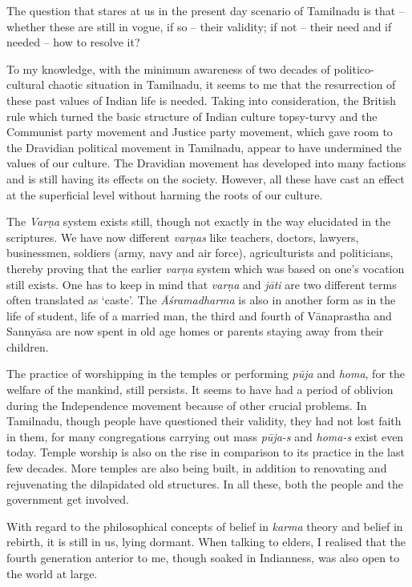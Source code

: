 The question that stares at us in the present day scenario of Tamilnadu is that – whether these are still in vogue, if so – their validity; if not – their need and if needed – how to resolve it?

To my knowledge, with the minimum awareness of two decades of politico-cultural chaotic situation in Tamilnadu, it seems to me that the resurrection of these past values of Indian life is needed. Taking into consideration, the British rule which turned the basic structure of Indian culture topsy-turvy and the Communist party movement and Justice party movement, which gave room to the Dravidian political movement in Tamilnadu, appear to have undermined the values of our culture. The Dravidian movement has developed into many factions and is still having its effects on the society. However, all these have cast an effect at the superficial level without harming the roots of our culture.

The \textit{Varṇa} system exists still, though not exactly in the way elucidated in the scriptures. We have now different \textit{varṇas} like teachers, doctors, lawyers, businessmen, soldiers (army, navy and air force), agriculturists and politicians, thereby proving that the earlier \textit{varṇa} system which was based on one’s vocation still exists. One has to keep in mind that \textit{varṇa} and \textit{jāti} are two different terms often translated as ‘caste’. The \textit{Āśramadharma} is also in another form as in the life of student, life of a married man, the third and fourth of Vānaprastha and Sannyāsa are now spent in old age homes or parents staying away from their children.

The practice of worshipping in the temples or performing \textit{pūja} and \textit{homa}, for the welfare of the mankind, still persists. It seems to have had a period of oblivion during the Independence movement because of other crucial problems. In Tamilnadu, though people have questioned their validity, they had not lost faith in them, for many congregations carrying out mass \textit{pūja-s} and \textit{homa-s} exist even today. Temple worship is also on the rise in comparison to its practice in the last few decades. More temples are also being built, in addition to renovating and rejuvenating the dilapidated old structures. In all these, both the people and the government get involved.

With regard to the philosophical concepts of belief in \textit{karma} theory and belief in rebirth, it is still in us, lying dormant. When talking to elders, I realised that the fourth generation anterior to me, though soaked in Indianness, was also open to the world at large.

